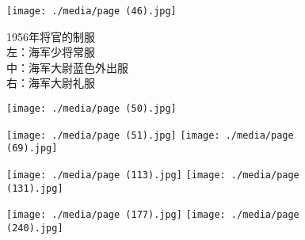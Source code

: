 \begin{figure}
    \texttt{[image: ./media/page (46).jpg]}
    \caption{1956年将官的制服\\左：海军少将常服\\中：海军大尉蓝色外出服\\右：海军大尉礼服}
\end{figure}

\begin{figure}
    \texttt{[image: ./media/page (50).jpg]}
    
    \texttt{[image: ./media/page (51).jpg]}
    \texttt{[image: ./media/page (69).jpg]}
\end{figure}

\begin{figure}
    \texttt{[image: ./media/page (113).jpg]}
    \texttt{[image: ./media/page (131).jpg]}
\end{figure}

\begin{figure}
    \texttt{[image: ./media/page (177).jpg]}
    \texttt{[image: ./media/page (240).jpg]}
\end{figure}